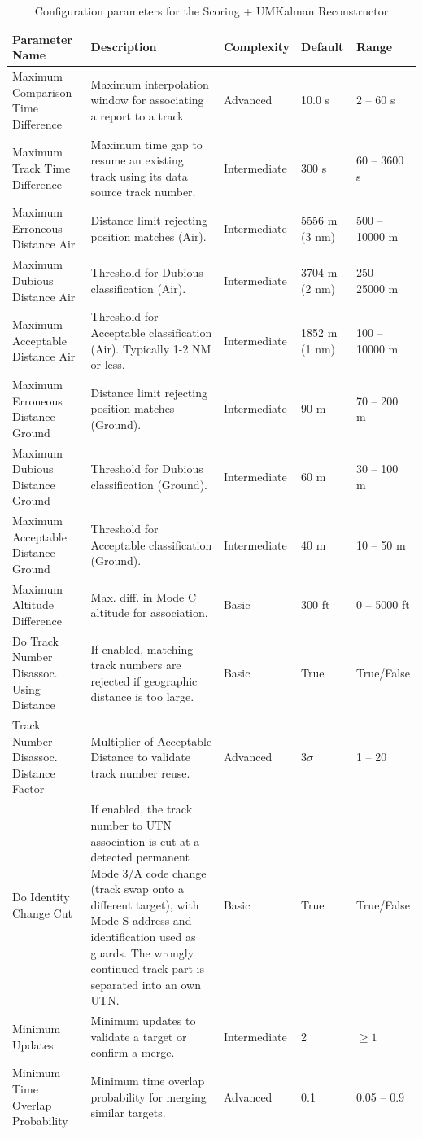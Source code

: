 \begin{table}[H]
    \centering
    \footnotesize
    \hspace*{-1.5cm}
    \begin{tabular}{|p{4.5cm}|p{6.5cm}|l|l|l|}
    \hline
    \textbf{Parameter Name} & \textbf{Description} & \textbf{Complexity} & \textbf{Default} & \textbf{Range} \\ \hline
    Maximum Comparison Time Difference & Maximum interpolation window for associating a report to a track. & Advanced & 10.0 s & 2 -- 60 s \\ \hline
    Maximum Track Time Difference & Maximum time gap to resume an existing track using its data source track number. & Intermediate & 300 s & 60 -- 3600 s \\ \hline
    Maximum Erroneous Distance Air & Distance limit rejecting position matches (Air). & Intermediate & 5556 m (3 nm) & 500 -- 10000 m \\ \hline
    Maximum Dubious Distance Air & Threshold for Dubious classification (Air). & Intermediate & 3704 m (2 nm) & 250 -- 25000 m \\ \hline
    Maximum Acceptable Distance Air & Threshold for Acceptable classification (Air). Typically 1-2 NM or less. & Intermediate & 1852 m (1 nm) & 100 -- 10000 m \\ \hline
    Maximum Erroneous Distance Ground & Distance limit rejecting position matches (Ground). & Intermediate & 90 m & 70 -- 200 m \\ \hline
    Maximum Dubious Distance Ground & Threshold for Dubious classification (Ground). & Intermediate & 60 m & 30 -- 100 m \\ \hline
    Maximum Acceptable Distance Ground & Threshold for Acceptable classification (Ground). & Intermediate & 40 m & 10 -- 50 m \\ \hline
    Maximum Altitude Difference & Max. diff. in Mode C altitude for association. & Basic & 300 ft & 0 -- 5000 ft \\ \hline
    Do Track Number Disassoc. Using Distance & If enabled, matching track numbers are rejected if geographic distance is too large. & Basic & True & True/False \\ \hline
    Track Number Disassoc. Distance Factor & Multiplier of Acceptable Distance to validate track number reuse. & Advanced & 3$\sigma$ & 1 -- 20 \\ \hline
    Do Identity Change Cut & If enabled, the track number to UTN association is cut at a detected permanent Mode 3/A code change (track swap onto a different target), with Mode S address and identification used as guards. The wrongly continued track part is separated into an own UTN. & Basic & True & True/False \\ \hline
    Minimum Updates & Minimum updates to validate a target or confirm a merge. & Intermediate & 2 & $\ge 1$ \\ \hline
    Minimum Time Overlap Probability & Minimum time overlap probability for merging similar targets. & Advanced & 0.1 & 0.05 -- 0.9 \\ \hline
    \end{tabular}
    \caption{Configuration parameters for the Scoring + UMKalman Reconstructor}
    \label{tab:reconst_simple_params}
\end{table}
